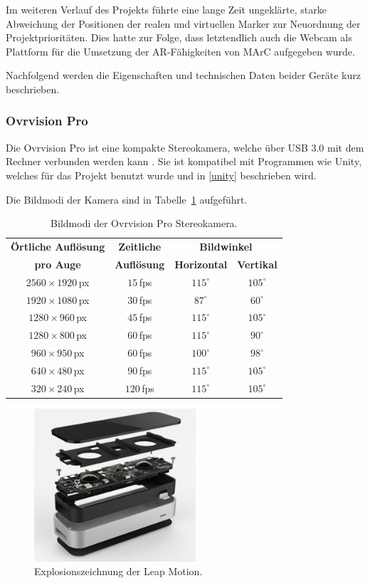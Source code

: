 Im weiteren Verlauf des Projekts führte eine lange Zeit ungeklärte, starke Abweichung der Positionen der realen und virtuellen Marker zur Neuordnung der Projektprioritäten. Dies hatte zur Folge, dass letztendlich auch die Webcam als Plattform für die Umsetzung der AR-Fähigkeiten von MArC aufgegeben wurde.

Nachfolgend werden die Eigenschaften und technischen Daten beider Geräte kurz beschrieben.
\subsubsection{Ovrvision Pro}\label{sec:ovrvision}
Die Ovrvision Pro ist eine kompakte Stereokamera, welche über USB 3.0 mit dem Rechner verbunden werden kann \cite{website:ovrvision}. Sie ist kompatibel mit Programmen wie Unity, welches für das Projekt benutzt wurde und in \ref{unity} beschrieben wird.

Die Bildmodi der Kamera sind in Tabelle~\ref{tab:ovrRes} aufgeführt.

\begin{table}
	\centering
	\begin{tabular}{|c|c|c|c|}
		\hline
		\Absatzbox{}
		\textbf{Örtliche Auflösung}& \textbf{Zeitliche} & \multicolumn{2}{c|}{\textbf{Bildwinkel}}\\
		\cline{3-4}
		\Absatzbox{}
		\textbf{pro Auge}& \textbf{Auflösung} & \textbf{Horizontal} & \textbf{Vertikal}\\
		\hline
		$2560\times1920$\,px & $15$\,fps & $115^\circ$ & $105^\circ$\\
		\hline
		$1920\times1080$\,px & $30$\,fps & $87^\circ$ & $60^\circ$\\
		\hline
		$1280\times960$\,px & $45$\,fps & $115^\circ$ & $105^\circ$\\
		\hline
		$1280\times800$\,px & $60$\,fps & $115^\circ$ & $90^\circ$\\
		\hline
		$960\times950$\,px & $60$\,fps & $100^\circ$ & $98^\circ$\\
		\hline
		$640\times480$\,px & $90$\,fps & $115^\circ$ & $105^\circ$\\
		\hline
		$320\times240$\,px & $120$\,fps & $115^\circ$ & $105^\circ$\\
		\hline
	\end{tabular}
	\caption{Bildmodi der Ovrvision Pro Stereokamera.
		\cite{website:ovrvisionProduct}}
	\label{tab:ovrRes}
\end{table}

\begin{figure}[H]
	\centering
	\includegraphics[width=6cm]{Bilder/leap-motion.png}			
		\caption{Explosionszeichnung der Leap Motion.\cite{website:LeapMotionBlog}}
		\label{fig:leapMotion}
\end{figure}
